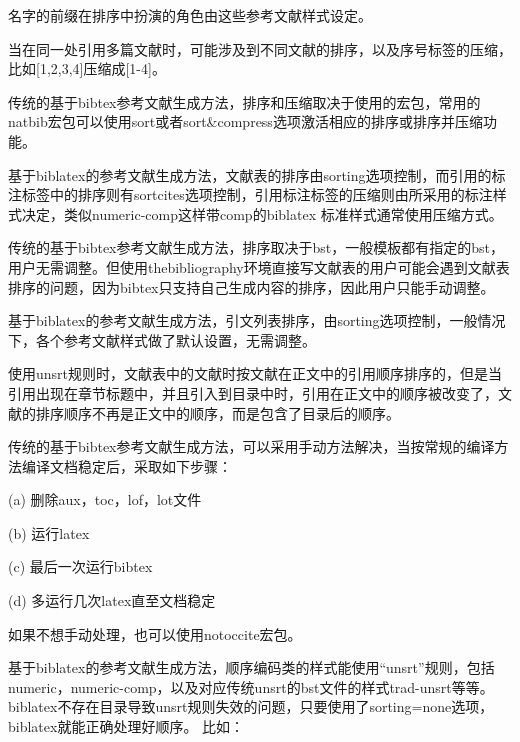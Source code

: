 名字的前缀在排序中扮演的角色由这些参考文献样式设定。





当在同一处引用多篇文献时，可能涉及到不同文献的排序，以及序号标签的压缩，比如[1,2,3,4]压缩成[1-4]。

传统的基于bibtex参考文献生成方法，排序和压缩取决于使用的宏包，常用的natbib宏包可以使用sort或者sort\&compress选项激活相应的排序或排序并压缩功能。

基于biblatex的参考文献生成方法，文献表的排序由sorting选项控制，而引用的标注标签中的排序则有sortcites选项控制，引用标注标签的压缩则由所采用的标注样式决定，类似numeric-comp这样带comp的biblatex 标准样式通常使用压缩方式。




传统的基于bibtex参考文献生成方法，排序取决于bst，一般模板都有指定的bst，用户无需调整。但使用thebibliography环境直接写文献表的用户可能会遇到文献表排序的问题，因为bibtex只支持自己生成内容的排序，因此用户只能手动调整。

基于biblatex的参考文献生成方法，引文列表排序，由sorting选项控制，一般情况下，各个参考文献样式做了默认设置，无需调整。




使用unsrt规则时，文献表中的文献时按文献在正文中的引用顺序排序的，但是当引用出现在章节标题中，并且引入到目录中时，引用在正文中的顺序被改变了，文献的排序顺序不再是正文中的顺序，而是包含了目录后的顺序。

传统的基于bibtex参考文献生成方法，可以采用手动方法解决，当按常规的编译方法编译文档稳定后，采取如下步骤：

(a) 删除aux，toc，lof，lot文件

(b) 运行latex

(c) 最后一次运行bibtex

(d) 多运行几次latex直至文档稳定

如果不想手动处理，也可以使用notoccite宏包。

基于biblatex的参考文献生成方法，顺序编码类的样式能使用“unsrt”规则，包括numeric，numeric-comp，以及对应传统unsrt的bst文件的样式trad-unsrt等等。biblatex不存在目录导致unsrt规则失效的问题，只要使用了sorting=none选项，biblatex就能正确处理好顺序。
比如：

